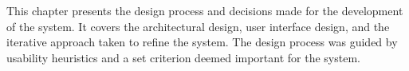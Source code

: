 This chapter presents the design process and decisions made for the development of the system.
It covers the architectural design, user interface design, and the iterative approach taken to refine the system.
The design process was guided by usability heuristics and a set criterion deemed important for the system.
